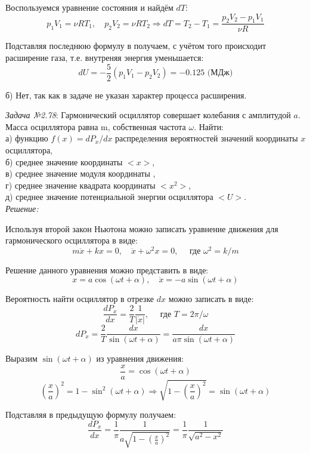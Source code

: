 \documentclass[14pt,final,titlepage,pscyr]{hedsemwork}
\begin{document}
Воспользуемся уравнение состояния и найдём \( dT \):
\[
	p_1 V_1 = \nu RT_1, \quad
	p_2 V_2 = \nu RT_2 \Rightarrow
	dT = T_2 - T_1 = \frac{p_2 V_2 - p_1 V_1}{\nu R}
\]

Подставляя последнюю формулу в \label{eq:dot} получаем, с учётом того 
происходит расширение газа, т.е. внутреняя энергия уменьшается:
\[
	dU = -\frac{5}{2}\left( p_1 V_1 - p_2 V_2 \right) = -0.125 \text{ (МДж)}
\]

б) Нет, так как в задаче не указан характер процесса расширения.

\newpage
\emph{Задача №2.78}: Гармонический осциллятор совершает колебания с 
амплитудой \( a \). Масса осциллятора равна m, собственная частота 
\( \omega \). Найти: \\
а) функцию \( f(x) = dP_x/dx \) распределения вероятностей значений 
	координаты \( x \) осциллятора, \\
б) среднее значение координаты \(<x>\), \\
в) среднее значение модуля координаты \(<|x|>\), \\
г) среднее значение квадрата координаты \(<x^2>\), \\
д) среднее значение потенциальной энергии осциллятора \(<U>\). \\

\emph{Решение:}

Используя второй закон Ньютона можно записать уравнение движения для 
гармонического осциллятора в виде:
\[
	m\ddot{x} + kx = 0, \quad
	\ddot{x} + \omega^2 x = 0, \quad \text{ где }\omega^2 = k/m
\]

Решение данного уравнения можно представить в виде:
\[
	x = a\cos(\omega t + \alpha), \quad
	\dot{x} = -a\sin(\omega t + \alpha)
\]

Вероятность найти осциллятор в отрезке \( dx \) можно записать в виде:
\[
	\frac{dP_x}{dx} = \frac{2}{T}\frac{1}{|\dot{x}|}, \quad 
		\text{ где } T = 2\pi/\omega
\]
\[
	dP_x = \frac{2}{T}\frac{dx}{\sin(\omega t + \alpha)} = 
		\frac{dx}{a\pi\sin(\omega t + \alpha)}
\]

Выразим \( \sin(\omega t + \alpha )\) из уравнения движения:
\[
	\frac{x}{a} = \cos(\omega t + \alpha)
\]
\[
	\left( \frac{x}{a} \right)^2 = 1 - \sin^2(\omega t + \alpha) 
		\Rightarrow \sqrt{1-\left( \frac{x}{a} \right)^2} = 
		\sin(\omega t + \alpha)
\]

Подставляя в предыдущую формулу получаем:
\[
	\frac{dP_x}{dx} = \frac{1}{\pi}
		\frac{1}{a\sqrt{1-\left( \frac{x}{a} \right)^2}} = 
		\frac{1}{\pi}\frac{1}{\sqrt{a^2-x^2}}
\]
\end{document}
